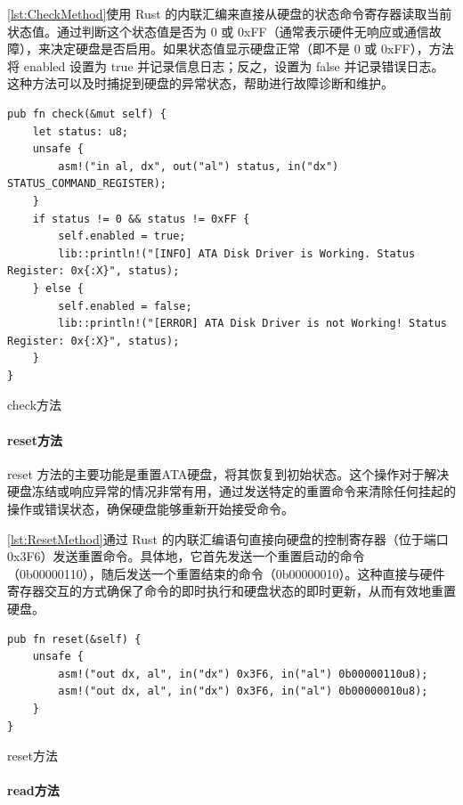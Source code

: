 \cref{lst:CheckMethod}使用 Rust 的内联汇编来直接从硬盘的状态命令寄存器读取当前状态值。通过判断这个状态值是否为 0 或 0xFF（通常表示硬件无响应或通信故障），来决定硬盘是否启用。如果状态值显示硬盘正常（即不是 0 或 0xFF），方法将 enabled 设置为 true 并记录信息日志；反之，设置为 false 并记录错误日志。这种方法可以及时捕捉到硬盘的异常状态，帮助进行故障诊断和维护。

\begin{listing}[htbp]
    \begin{verbatim}
pub fn check(&mut self) {
    let status: u8;
    unsafe {
        asm!("in al, dx", out("al") status, in("dx") STATUS_COMMAND_REGISTER);
    }
    if status != 0 && status != 0xFF {
        self.enabled = true;
        lib::println!("[INFO] ATA Disk Driver is Working. Status Register: 0x{:X}", status);
    } else {
        self.enabled = false;
        lib::println!("[ERROR] ATA Disk Driver is not Working! Status Register: 0x{:X}", status);
    }
}
    \end{verbatim}
    \caption{check方法}\label{lst:CheckMethod}
\end{listing}

\paragraph{reset方法}

reset 方法的主要功能是重置ATA硬盘，将其恢复到初始状态。这个操作对于解决硬盘冻结或响应异常的情况非常有用，通过发送特定的重置命令来清除任何挂起的操作或错误状态，确保硬盘能够重新开始接受命令。

\cref{lst:ResetMethod}通过 Rust 的内联汇编语句直接向硬盘的控制寄存器（位于端口 0x3F6）发送重置命令。具体地，它首先发送一个重置启动的命令（0b00000110），随后发送一个重置结束的命令（0b00000010）。这种直接与硬件寄存器交互的方式确保了命令的即时执行和硬盘状态的即时更新，从而有效地重置硬盘。

\begin{listing}[htbp]
    \begin{verbatim}
pub fn reset(&self) {
    unsafe {
        asm!("out dx, al", in("dx") 0x3F6, in("al") 0b00000110u8);
        asm!("out dx, al", in("dx") 0x3F6, in("al") 0b00000010u8);
    }
}
    \end{verbatim}
    \caption{reset方法}\label{lst:ResetMethod}
\end{listing}

\paragraph{read方法}

